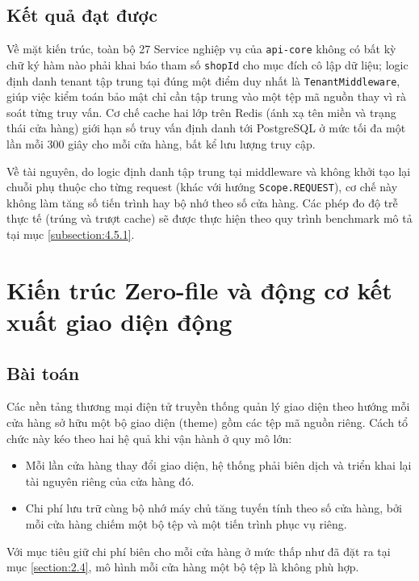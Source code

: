 \documentclass[../main.tex]{subfiles}
\begin{document}
\subsection{Kết quả đạt được}
\label{subsection:5.1.3}

Về mặt kiến trúc, toàn bộ 27 Service nghiệp vụ của \texttt{api-core} không có bất kỳ chữ ký hàm nào phải khai báo tham số \texttt{shopId} cho mục đích cô lập dữ liệu; logic định danh tenant tập trung tại đúng một điểm duy nhất là \texttt{TenantMiddleware}, giúp việc kiểm toán bảo mật chỉ cần tập trung vào một tệp mã nguồn thay vì rà soát từng truy vấn. Cơ chế cache hai lớp trên Redis (ánh xạ tên miền và trạng thái cửa hàng) giới hạn số truy vấn định danh tới PostgreSQL ở mức tối đa một lần mỗi 300 giây cho mỗi cửa hàng, bất kể lưu lượng truy cập.

Về tài nguyên, do logic định danh tập trung tại middleware và không khởi tạo lại chuỗi phụ thuộc cho từng request (khác với hướng \texttt{Scope.REQUEST}), cơ chế này không làm tăng số tiến trình hay bộ nhớ theo số cửa hàng. Các phép đo độ trễ thực tế (trúng và trượt cache) sẽ được thực hiện theo quy trình benchmark mô tả tại mục \ref{subsection:4.5.1}.

\section{Kiến trúc Zero-file và động cơ kết xuất giao diện động}
\label{section:5.2}

\subsection{Bài toán}
\label{subsection:5.2.1}

Các nền tảng thương mại điện tử truyền thống quản lý giao diện theo hướng mỗi cửa hàng sở hữu một bộ giao diện (theme) gồm các tệp mã nguồn riêng. Cách tổ chức này kéo theo hai hệ quả khi vận hành ở quy mô lớn:

\begin{itemize}
    \item Mỗi lần cửa hàng thay đổi giao diện, hệ thống phải biên dịch và triển khai lại tài nguyên riêng của cửa hàng đó.
    \item Chi phí lưu trữ cùng bộ nhớ máy chủ tăng tuyến tính theo số cửa hàng, bởi mỗi cửa hàng chiếm một bộ tệp và một tiến trình phục vụ riêng.
\end{itemize}

Với mục tiêu giữ chi phí biên cho mỗi cửa hàng ở mức thấp như đã đặt ra tại mục \ref{section:2.4}, mô hình mỗi cửa hàng một bộ tệp là không phù hợp.
\end{document}
